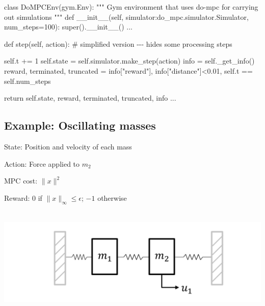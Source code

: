 \documentclass[
  letterpaper,
  DIV=11,
  numbers=noendperiod,
  oneside]{scrartcl}
\newenvironment{Shaded}{\begin{snugshade}}{\end{snugshade}}
\newcommand{\BuiltInTok}[1]{\textcolor[rgb]{0.00,0.23,0.31}{#1}}
\newcommand{\CommentTok}[1]{\textcolor[rgb]{0.37,0.37,0.37}{#1}}
\newcommand{\ControlFlowTok}[1]{\textcolor[rgb]{0.00,0.23,0.31}{#1}}
\newcommand{\DecValTok}[1]{\textcolor[rgb]{0.68,0.00,0.00}{#1}}
\newcommand{\FloatTok}[1]{\textcolor[rgb]{0.68,0.00,0.00}{#1}}
\newcommand{\FunctionTok}[1]{\textcolor[rgb]{0.28,0.35,0.67}{#1}}
\newcommand{\KeywordTok}[1]{\textcolor[rgb]{0.00,0.23,0.31}{#1}}
\newcommand{\NormalTok}[1]{\textcolor[rgb]{0.00,0.23,0.31}{#1}}
\newcommand{\OperatorTok}[1]{\textcolor[rgb]{0.37,0.37,0.37}{#1}}
\newcommand{\StringTok}[1]{\textcolor[rgb]{0.13,0.47,0.30}{#1}}
\newcommand{\VariableTok}[1]{\textcolor[rgb]{0.07,0.07,0.07}{#1}}
\begin{document}
\begin{Shaded}
\begin{Highlighting}[numbers=left,,]
\KeywordTok{class}\NormalTok{ DoMPCEnv(gym.Env):}
    \CommentTok{"""}
\CommentTok{    Gym environment that uses do{-}mpc for carrying out simulations}
\CommentTok{    """}
    \KeywordTok{def} \FunctionTok{\_\_init\_\_}\NormalTok{(}\VariableTok{self}\NormalTok{, simulator:do\_mpc.simulator.Simulator, }
\NormalTok{                    num\_steps}\OperatorTok{=}\DecValTok{100}\NormalTok{):        }
        \BuiltInTok{super}\NormalTok{().}\FunctionTok{\_\_init\_\_}\NormalTok{()}
\NormalTok{        ...}

    \KeywordTok{def}\NormalTok{ step(}\VariableTok{self}\NormalTok{, action):}
        \CommentTok{\# simplified version {-}{-}{-} hides some processing steps}

        \VariableTok{self}\NormalTok{.t }\OperatorTok{+=} \DecValTok{1}
        \VariableTok{self}\NormalTok{.state }\OperatorTok{=} \VariableTok{self}\NormalTok{.simulator.make\_step(action)}
\NormalTok{        info }\OperatorTok{=} \VariableTok{self}\NormalTok{.\_get\_info()}
\NormalTok{        reward, terminated, truncated }\OperatorTok{=}\NormalTok{ info[}\StringTok{"reward"}\NormalTok{], info[}\StringTok{"distance"}\NormalTok{]}\OperatorTok{\textless{}}\FloatTok{0.01}\NormalTok{, }\VariableTok{self}\NormalTok{.t }\OperatorTok{==} \VariableTok{self}\NormalTok{.num\_steps}

        \ControlFlowTok{return} \VariableTok{self}\NormalTok{.state, reward, terminated, truncated, info}
\NormalTok{    ...}
\end{Highlighting}
\end{Shaded}

\subsection{Example: Oscillating
masses}\label{example-oscillating-masses}

State: Position and velocity of each mass

Action: Force applied to \(m_2\)

MPC cost: \(\lVert x \rVert^2\)

Reward: 0 if \(\lVert x \rVert_{\infty} \leq \epsilon\); \(-1\)
otherwise

\begin{center}
\includegraphics[width=\textwidth,height=2.08333in]{figs/oscillating_masses.png}
\end{center}
\end{document}
